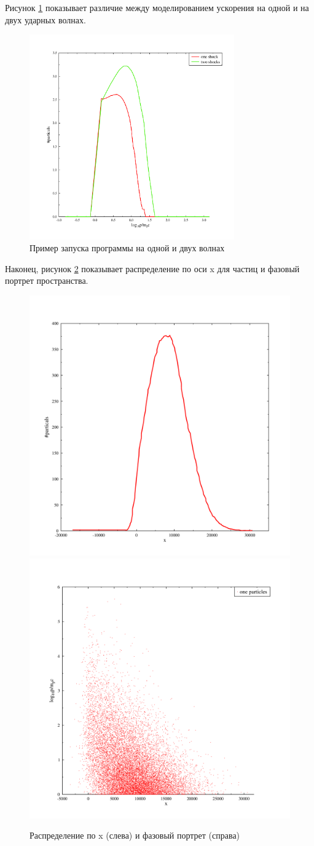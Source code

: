 \documentclass[a4paper,14pt]{extarticle} %
\begin{document}
Рисунок \ref{res/stoh/two} показывает различие между моделированием ускорения на одной и на двух ударных волнах.
\begin{figure}[!htb]
\centering
\includegraphics[width=250pt]{stoh_two_or_one}
\caption{Пример запуска программы на одной и двух волнах}
\label{res/stoh/two}
\end{figure}

Наконец, рисунок \ref{res/stoh/x} показывает распределение по оси x для частиц и фазовый портрет пространства.
\begin{figure}[!htb]
\centering
\includegraphics[width=0.3\linewidth]{stoh_x}
\includegraphics[width=0.3\linewidth]{stoh_px}

\caption{Распределение по x (слева) и фазовый портрет (справа)}
\label{res/stoh/x}
\end{figure}



\end{document}
